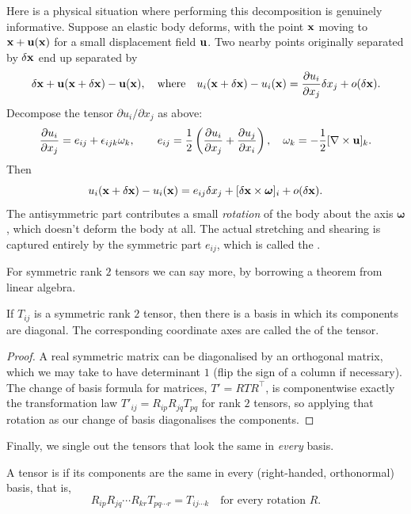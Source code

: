 \documentclass[a4paper]{scrartcl}
\begin{document}
\begin{example}
	Here is a physical situation where performing this decomposition is genuinely informative. Suppose an elastic body deforms, with the point $\mathbf{x}$ moving to $\mathbf{x} + \mathbf{u}(\mathbf{x})$ for a small displacement field $\mathbf{u}$. Two nearby points originally separated by $\delta \mathbf{x}$ end up separated by
	$$
	\delta \mathbf{x} + \mathbf{u}(\mathbf{x} + \delta \mathbf{x}) - \mathbf{u}(\mathbf{x}), \quad \text{where} \quad u_i(\mathbf{x} + \delta \mathbf{x}) - u_i(\mathbf{x}) = \frac{\partial u_i}{\partial x_j} \delta x_j + o(\delta \mathbf{x}).
	$$
	Decompose the tensor $\partial u_i/\partial x_j$ as above:
	$$
	\frac{\partial u_i}{\partial x_j} = e_{ij} + \epsilon_{ijk}\omega_k, \quad \quad e_{ij} = \frac{1}{2}\left(\frac{\partial u_i}{\partial x_j} + \frac{\partial u_j}{\partial x_i}\right), \quad \omega_k = -\frac{1}{2}[\nabla \times \mathbf{u}]_k.
	$$
	Then
	$$
	u_i(\mathbf{x} + \delta \mathbf{x}) - u_i(\mathbf{x}) = e_{ij}\delta x_j + [\delta \mathbf{x} \times \boldsymbol{\omega}]_i + o(\delta \mathbf{x}).
	$$
	The antisymmetric part contributes a small \emph{rotation} of the body about the axis $\boldsymbol{\omega}$, which doesn't deform the body at all. The actual stretching and shearing is captured entirely by the symmetric part $e_{ij}$, which is called the .
\end{example}

For symmetric rank $2$ tensors we can say more, by borrowing a theorem from linear algebra.

\begin{proposition}
	If $T_{ij}$ is a symmetric rank $2$ tensor, then there is a basis in which its components are diagonal. The corresponding coordinate axes are called the  of the tensor.
\end{proposition}
\begin{proof}
	A real symmetric matrix can be diagonalised by an orthogonal matrix, which we may take to have determinant $1$ (flip the sign of a column if necessary). The change of basis formula for matrices, $T' = R T R^\top$, is componentwise exactly the transformation law $T'_{ij} = R_{ip}R_{jq}T_{pq}$ for rank $2$ tensors, so applying that rotation as our change of basis diagonalises the components.
\end{proof}

Finally, we single out the tensors that look the same in \emph{every} basis.

\begin{definition}
	A tensor is  if its components are the same in every (right-handed, orthonormal) basis, that is,
	$$
	R_{ip}R_{jq}\cdots R_{kr} T_{pq \cdots r} = T_{ij \cdots k} \quad \text{for every rotation } R.
	$$
\end{definition}
\end{document}
